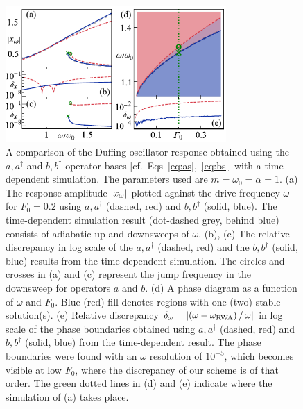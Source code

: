 \begin{figure}
	\centering
	\includegraphics[width=0.75\textwidth]{figures/rwa/fig2.pdf}
	\caption{A comparison of the Duffing oscillator response obtained using the $a, a^\dagger$ and $b, b^\dagger$ operator bases [cf.~Eqs~\eqref{eq:as},~\eqref{eq:bs}] with a time-dependent simulation. The parameters used are $m=\omega_0=\alpha=1$. (a) The response amplitude $\abs{x_\omega}$ plotted against the drive frequency $\omega$ for $F_0=0.2$ using $a, a^\dagger$ (dashed, red) and $b,b^\dagger$ (solid, blue). The time-dependent simulation result (dot-dashed grey, behind blue) consists of adiabatic up and downsweeps of $\omega$.
		(b), (c) The relative discrepancy in log scale of the $a,a^\dagger$ (dashed, red) and the $b, b^\dagger$ (solid, blue) results from the time-dependent simulation. %
		The circles and crosses in (a) and (c) represent the jump frequency in the downsweep for operators $a$ and $b$.
		(d) A phase diagram as a function of $\omega$ and $F_0$. Blue (red) fill denotes regions with one (two) stable solution(s). %
		(e) Relative discrepancy $\delta_{\omega} = \abs{(\omega - \omega_{\text{RWA}}) \,/\, \omega }$ in log scale of the phase boundaries obtained using $a, a^\dagger$ (dashed, red) and $b, b^\dagger$ (solid, blue) from the time-dependent result. The phase boundaries were found with an $\omega$ resolution of $10^{-5}$, which becomes visible at low $F_0$, where the discrepancy of our scheme is of that order. The green dotted lines in (d) and (e) indicate where the simulation of (a) takes place.
	}
	\label{fig:fig2}
\end{figure}

